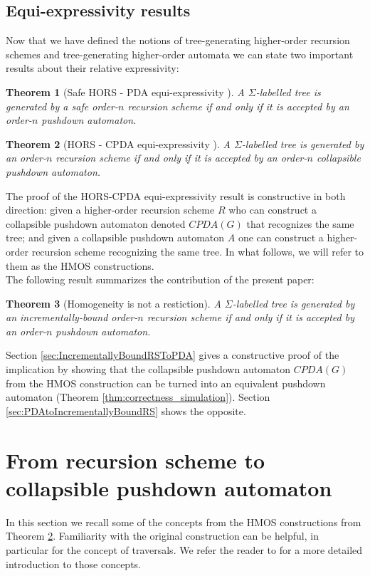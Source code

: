 \documentclass[a4paper]{article}[12pt]
\newtheorem{theorem}{Theorem}[section]
\theoremstyle{remark}
\theoremstyle{definition}
\begin{document}
\subsection{Equi-expressivity results}

Now that we have defined the notions of tree-generating higher-order recursion schemes and
tree-generating higher-order automata we can state two important results about their relative expressivity:

\begin{theorem}[Safe HORS - PDA equi-expressivity \cite{KNU02}]
A $\Sigma$-labelled tree is generated by a \emph{safe} order-$n$ recursion scheme if and only if it is accepted by an order-$n$ pushdown automaton.
\end{theorem}

\begin{theorem}[HORS - CPDA equi-expressivity \cite{hmos-lics08}]
	\label{thm:HMOS-equiexpr}
	A $\Sigma$-labelled tree is generated by an order-$n$ recursion scheme if and only if it is accepted by an order-$n$ collapsible pushdown automaton.
\end{theorem}
The proof of the HORS-CPDA equi-expressivity result is constructive in both direction: given a higher-order recursion scheme $R$ who can construct a collapsible pushdown automaton denoted $CPDA(G)$ that recognizes the same tree; and given a collapsible pushdown automaton $A$ one can construct a higher-order recursion scheme recognizing the same tree. In what follows, we will refer to them as the HMOS constructions.
\\

The following result summarizes the contribution of the present paper:
\begin{theorem}[Homogeneity is not a restiction]
	A $\Sigma$-labelled tree is generated by an \emph{incrementally-bound} order-$n$ recursion scheme if and only if it is accepted by an order-$n$ pushdown automaton.
\end{theorem}
Section \ref{sec:IncrementallyBoundRSToPDA} gives a constructive proof of the implication by showing that the collapsible pushdown automaton $CPDA(G)$ from the HMOS construction can be turned into an equivalent pushdown automaton (Theorem \ref{thm:correctness_simulation}).
Section \ref{sec:PDAtoIncrementallyBoundRS} shows the opposite.


\section{From recursion scheme to collapsible pushdown automaton}
In this section we recall some of the concepts from the HMOS constructions from Theorem \ref{thm:HMOS-equiexpr}. Familiarity with the original construction can be helpful, in particular for the concept of traversals. We refer the reader to \cite{hmos-lics08} for a more detailed introduction to those concepts.
\end{document}
